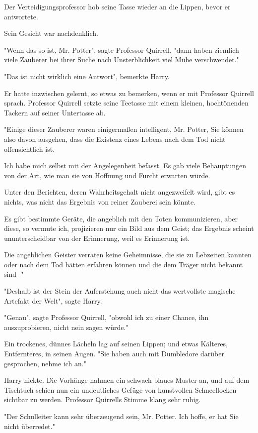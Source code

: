 {Der Verteidigungsprofessor hob seine Tasse wieder an die Lippen, bevor er antwortete.

Sein Gesicht war nachdenklich.

"Wenn das so ist, Mr. Potter", sagte Professor Quirrell, "dann haben ziemlich viele Zauberer bei ihrer Suche nach Unsterblichkeit viel Mühe verschwendet."

"Das ist nicht wirklich eine Antwort", bemerkte Harry.

Er hatte inzwischen gelernt, so etwas zu bemerken, wenn er mit Professor Quirrell sprach. Professor Quirrell setzte seine Teetasse mit einem kleinen, hochtönenden Tackern auf seiner Untertasse ab.

"Einige dieser Zauberer waren einigermaßen intelligent, Mr. Potter, Sie können also davon ausgehen, dass die Existenz eines Lebens nach dem Tod nicht offensichtlich ist.

Ich habe mich selbst mit der Angelegenheit befasst. Es gab viele Behauptungen von der Art, wie man sie von Hoffnung und Furcht erwarten würde.

Unter den Berichten, deren Wahrheitsgehalt nicht angezweifelt wird, gibt es nichts, was nicht das Ergebnis von reiner Zauberei sein könnte.

Es gibt bestimmte Geräte, die angeblich mit den Toten kommunizieren, aber diese, so vermute ich, projizieren nur ein Bild aus dem Geist; das Ergebnis scheint ununterscheidbar von der Erinnerung, weil es Erinnerung ist.

Die angeblichen Geister verraten keine Geheimnisse, die sie zu Lebzeiten kannten oder nach dem Tod hätten erfahren können und die dem Träger nicht bekannt sind -"

"Deshalb ist der Stein der Auferstehung auch nicht das wertvollste magische Artefakt der Welt", sagte Harry.

"Genau", sagte Professor Quirrell, "obwohl ich zu einer Chance, ihn auszuprobieren, nicht nein sagen würde."

Ein trockenes, dünnes Lächeln lag auf seinen Lippen; und etwas Kälteres, Entfernteres, in seinen Augen. "Sie haben auch mit Dumbledore darüber gesprochen, nehme ich an."

Harry nickte. Die Vorhänge nahmen ein schwach blaues Muster an, und auf dem Tischtuch schien nun ein undeutliches Gefüge von kunstvollen Schneeflocken sichtbar zu werden. Professor Quirrells Stimme klang sehr ruhig.

"Der Schulleiter kann sehr überzeugend sein, Mr. Potter. Ich hoffe, er hat Sie nicht überredet."

}
